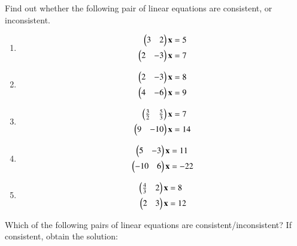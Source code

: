\item Find out whether the following pair of linear
equations are consistent, or inconsistent.
%
\begin{enumerate}[itemsep=2pt]
\item
\begin{align}
\begin{split}
\begin{pmatrix}3 & 2 \end{pmatrix}\mathbf{x}&=5
\\
\begin{pmatrix}2 & -3 \end{pmatrix}\mathbf{x}&=7
\end{split}
\end{align}
\item
\begin{align}
\begin{split}
\begin{pmatrix}2 & -3 \end{pmatrix}\mathbf{x}&=8
\\
\begin{pmatrix}4 & -6 \end{pmatrix}\mathbf{x}&=9
\end{split}
\end{align}
\item
\begin{align}
\begin{split}
\begin{pmatrix}\frac{3}{2} & \frac{5}{3} \end{pmatrix}\mathbf{x}&=7
\\
\begin{pmatrix}9 & -10 \end{pmatrix}\mathbf{x}&=14
\end{split}
\end{align}
\item
\begin{align}
\begin{split}
\begin{pmatrix}5 & -3 \end{pmatrix}\mathbf{x}&=11
\\
\begin{pmatrix}-10 & 6 \end{pmatrix}\mathbf{x}&=-22
\end{split}
\end{align}
\item
\begin{align}
\begin{split}
\begin{pmatrix}\frac{4}{3} & 2 \end{pmatrix}\mathbf{x}&=8
\\
\begin{pmatrix}2 & 3 \end{pmatrix}\mathbf{x}&=12
\end{split}
\end{align}
\end{enumerate}
%
\item Which of the following pairs of linear equations are consistent/inconsistent? If consistent, obtain the solution:
%
